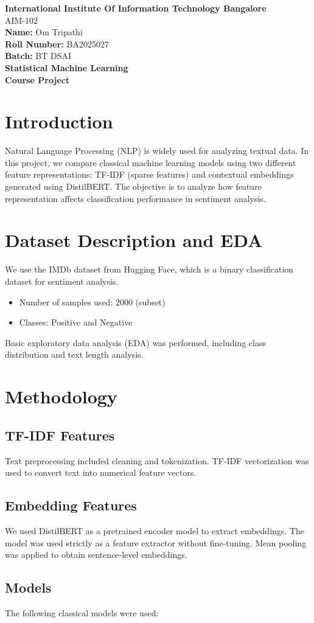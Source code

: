 \documentclass[11pt]{article}
\begin{document}
\begin{titlepage}
\centering
\vspace*{2cm}
{\Huge \textbf{International Institute Of Information Technology Bangalore}}\\[1 cm]
{\Large AIM-102}\\[2cm]
\textbf{Name:} Om Tripathi\\[0.5cm]
\textbf{Roll Number:} BA2025027\\[0.5cm]
\textbf{Batch:} BT DSAI\\[1.5cm]
\textbf{Statistical Machine Learning}\\
\textbf{Course Project}\\
\vfill
\end{titlepage}
\newpage
\section{Introduction}
Natural Language Processing (NLP) is widely used for analyzing textual data. In this project, we compare classical machine learning models using two different feature representations: TF-IDF (sparse features) and contextual embeddings generated using DistilBERT.
The objective is to analyze how feature representation affects classification performance in sentiment analysis.
\section{Dataset Description and EDA}
We use the IMDb dataset from Hugging Face, which is a binary classification dataset for sentiment analysis.
\begin{itemize}
    \item Number of samples used: 2000 (subset)
    \item Classes: Positive and Negative
\end{itemize}
Basic exploratory data analysis (EDA) was performed, including class distribution and text length analysis.
\section{Methodology}
\subsection{TF-IDF Features}
Text preprocessing included cleaning and tokenization. TF-IDF vectorization was used to convert text into numerical feature vectors.
\subsection{Embedding Features}
We used DistilBERT as a pretrained encoder model to extract embeddings. The model was used strictly as a feature extractor without fine-tuning.
Mean pooling was applied to obtain sentence-level embeddings.
\subsection{Models}
The following classical models were used:
\end{document}
